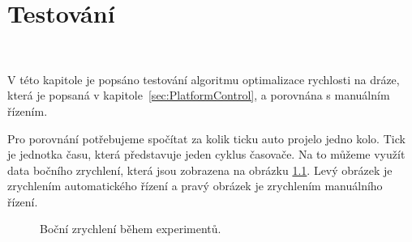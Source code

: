 \chapter{Testování}
\label{sec:Testing}
\vspace{-20pt}
\

V této kapitole je popsáno testování algoritmu optimalizace rychlosti na dráze,
která je popsaná v kapitole~\ref{sec:PlatformControl}, a porovnána s manuálním
řízením.

Pro porovnání potřebujeme spočítat za kolik ticku auto projelo jedno kolo. Tick je
jednotka času, která představuje jeden cyklus časovače. Na to můžeme využít data
bočního zrychlení, která jsou zobrazena na obrázku \ref{fig:Laps}. Levý obrázek je
zrychlením automatického řízení a pravý obrázek je zrychlením manuálního řízení.

\begin{figure}[!h]
    \centering
    \caption{Boční zrychlení během experimentů.}
    \label{fig:Laps}
\end{figure}

